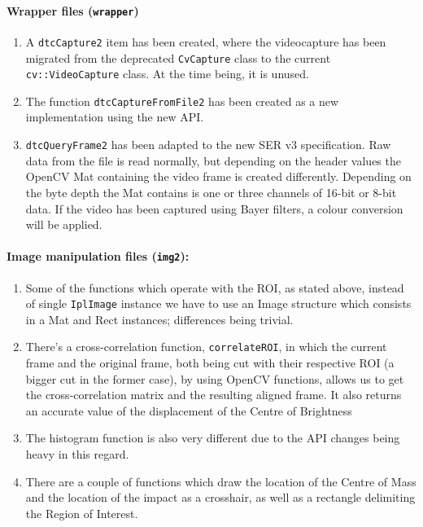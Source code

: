 \documentclass[a4paper,11pt]{memoir}
\begin{document}
\paragraph{Wrapper files (\texttt{wrapper})}
\begin{enumerate}
\item A \texttt{dtcCapture2} item has been created, where the videocapture has been migrated from the deprecated \texttt{CvCapture} class to the current \texttt{cv::VideoCapture} class. At the time being, it is unused.
\item The function \texttt{dtcCaptureFromFile2} has been created as a new implementation using the new API.
\item \texttt{dtcQueryFrame2} has been adapted to the new SER v3 specification. Raw data from the file is read normally, but depending on the header values the OpenCV Mat containing the video frame is created differently. Depending on the byte depth the Mat contains is one or three channels of 16-bit or 8-bit data. If the video has been captured using Bayer filters, a colour conversion will be applied.
\end{enumerate}

\paragraph{Image manipulation files (\texttt{img2}):}

\begin{enumerate}
\item Some of the functions which operate with the ROI, as stated above, instead of single \texttt{IplImage} instance we have to use an Image structure which consists in a Mat and Rect instances; differences being trivial.
\item There’s a cross-correlation function, \texttt{correlateROI}, in which the current frame and the original frame, both being cut with their respective ROI (a bigger cut in the former case), by using OpenCV functions, allows us to get the cross-correlation matrix and the resulting aligned frame. It also returns an accurate value of the displacement of the Centre of Brightness
\item The histogram function is also very different due to the API changes being heavy in this regard.
\item There are a couple of functions which draw the location of the Centre of Mass and the location of the impact as a crosshair, as well as a rectangle delimiting the Region of Interest.
\end{enumerate}
\end{document}
